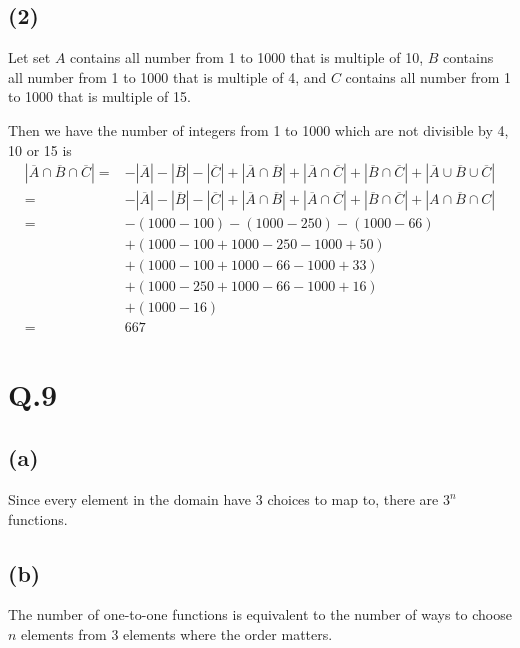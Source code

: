\documentclass[a4paper,12pt]{article}
\begin{document}
\subsection*{(2)}

Let set $A$ contains all number from 1 to 1000 that is multiple of 10, $B$ contains all number from 1 to 1000 that is multiple of 4, and $C$ contains all number from 1 to 1000 that is multiple of 15.

Then we have the number of integers from 1 to 1000 which are not divisible by 4, 10 or 15 is
\begin{align*}
	|\overline{A} \cap \overline{B} \cap \overline{C}| =& - |\overline{A}| - |\overline{B}| - |\overline{C}| + |\overline{A} \cap \overline{B}| + |\overline{A} \cap \overline{C}| + |\overline{B} \cap \overline{C}| + |\overline{A} \cup \overline{B} \cup \overline{C}| \\
	=& - |\overline{A}| - |\overline{B}| - |\overline{C}| + |\overline{A} \cap \overline{B}| + |\overline{A} \cap \overline{C}| + |\overline{B} \cap \overline{C}| + |\overline{A \cap B \cap C}| \\
	=& - (1000 - 100) - (1000 - 250) - (1000 - 66) \\
	 &+ (1000 - 100 + 1000 - 250 - 1000 + 50) \\
	 &+ (1000 - 100 + 1000 - 66 - 1000 + 33) \\
	 &+ (1000 - 250 + 1000 - 66 - 1000 + 16) \\
	 &+ (1000 - 16) \\
	=& 667
\end{align*}

\section*{Q.9}

\subsection*{(a)}

Since every element in the domain have 3 choices to map to, there are $3^n$ functions.

\subsection*{(b)}

The number of one-to-one functions is equivalent to the number of ways to choose $n$ elements from 3 elements where the order matters.
\end{document}
